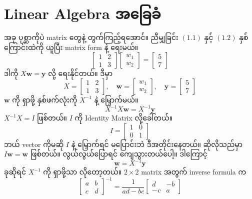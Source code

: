 \section{Linear Algebra အခြေခံ}
အခု ပုစ္ဆာကိုပဲ matrix တွေနဲ့ တွက်ကြည့်ရအောင်။ ညီမျှခြင်း $(1.1)$ နှင့် $(1.2)$ နှစ်ကြောင်းထဲကို ယူပြီး matrix form နဲ့ ရေးမယ်။
$$
\begin{bmatrix} 1 & 2 \\ 1 & 3 \end{bmatrix} \begin{bmatrix} w_1 \\ w_2 \end{bmatrix} = \begin{bmatrix} 5 \\ 7 \end{bmatrix}
$$
ဒါကို $X\mathbf{w} = \mathbf{y}$ လို့ ရေးနိုင်တယ်။ ဒီမှာ
$$
X = \begin{bmatrix} 1 & 2 \\ 1 & 3 \end{bmatrix}, \quad
\mathbf{w} = \begin{bmatrix} w_1 \\ w_2 \end{bmatrix}, \quad
\mathbf{y} = \begin{bmatrix} 5 \\ 7 \end{bmatrix}
$$
\noindent $\mathbf{w}$ ကို ရှာဖို့ နှစ်ဖက်လုံးကို $X^{-1}$ နဲ့ မြှောက်မယ်။
$$
X^{-1} X \mathbf{w} = X^{-1} \mathbf{y}
$$
\noindent $X^{-1}X = I$ ဖြစ်တယ်။ $I$ ကို Identity Matrix လို့ခေါ်တယ်။
$$
I = \begin{bmatrix} 1 & 0 \\ 0 & 1 \end{bmatrix}
$$
\noindent ဘယ် vector ကိုမဆို $I$ နဲ့ မြှောက်ရင် မပြောင်းဘဲ ဒီအတိုင်းနေတယ်။ ဆိုလိုသည်မှာ $I\mathbf{w} = \mathbf{w}$ ဖြစ်တယ်။ လွယ်လွယ်ပြောရင် ကျေသွားတယ်ပေါ့။ ဒါကြောင့်
$$
\mathbf{w} = X^{-1} \mathbf{y}
$$
\noindent ခုဆိုရင် $X^{-1}$ ကို ရှာဖို့သာ လိုတော့တယ်။ $2 \times 2$ matrix အတွက် inverse formula က
$$
\begin{bmatrix} a & b \\ c & d \end{bmatrix}^{-1} = \frac{1}{ad - bc} \begin{bmatrix} d & -b \\ -c & a \end{bmatrix}
$$
